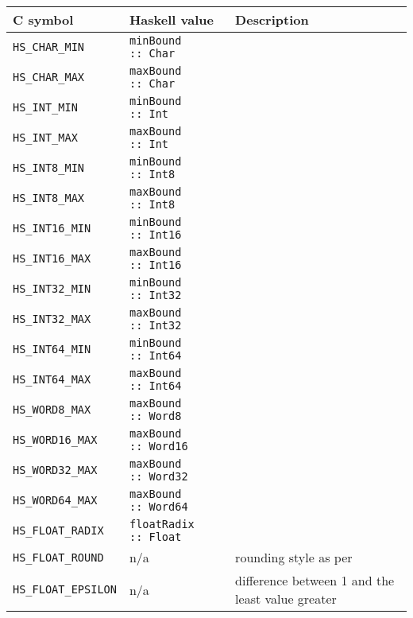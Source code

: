 \documentclass[a4paper,twoside]{article}
\newcommand{\code}[1]{\texttt{#1}}      %
\begin{document}
\begin{table}
  \begin{center}
    \begin{tabular}{|l|l|p{30ex}|}
      \hline
      C symbol           & Haskell value & Description\\
      \hline\hline
      \code{HS\_CHAR\_MIN} & \code{minBound ::\ Char}
      & \\
      \hline
      \code{HS\_CHAR\_MAX} & \code{maxBound ::\ Char}
      & \\
      \hline
      \code{HS\_INT\_MIN} & \code{minBound ::\ Int}
      & \\
      \hline
      \code{HS\_INT\_MAX} & \code{maxBound ::\ Int}
      & \\
      \hline
      \code{HS\_INT8\_MIN} & \code{minBound ::\ Int8}
      & \\
      \hline
      \code{HS\_INT8\_MAX} & \code{maxBound ::\ Int8}
      & \\
      \hline
      \code{HS\_INT16\_MIN} & \code{minBound ::\ Int16}
      & \\
      \hline
      \code{HS\_INT16\_MAX} & \code{maxBound ::\ Int16}
      & \\
      \hline
      \code{HS\_INT32\_MIN} & \code{minBound ::\ Int32}
      & \\
      \hline
      \code{HS\_INT32\_MAX} & \code{maxBound ::\ Int32}
      & \\
      \hline
      \code{HS\_INT64\_MIN} & \code{minBound ::\ Int64}
      & \\
      \hline
      \code{HS\_INT64\_MAX} & \code{maxBound ::\ Int64}
      & \\
      \hline
      \code{HS\_WORD8\_MAX} & \code{maxBound ::\ Word8}
      & \\
      \hline
      \code{HS\_WORD16\_MAX} & \code{maxBound ::\ Word16}
      & \\
      \hline
      \code{HS\_WORD32\_MAX} & \code{maxBound ::\ Word32}
      & \\
      \hline
      \code{HS\_WORD64\_MAX} & \code{maxBound ::\ Word64}
      & \\
      \hline
      \code{HS\_FLOAT\_RADIX} & \code{floatRadix ::\ Float}
      & \\
      \hline
      \code{HS\_FLOAT\_ROUND} & n/a
      & rounding style as per~\cite{C99}\\
      \hline
      \code{HS\_FLOAT\_EPSILON} & n/a
      & difference between 1 and the least value greater

\end{tabular}
\end{center}
\end{table}
\end{document}
